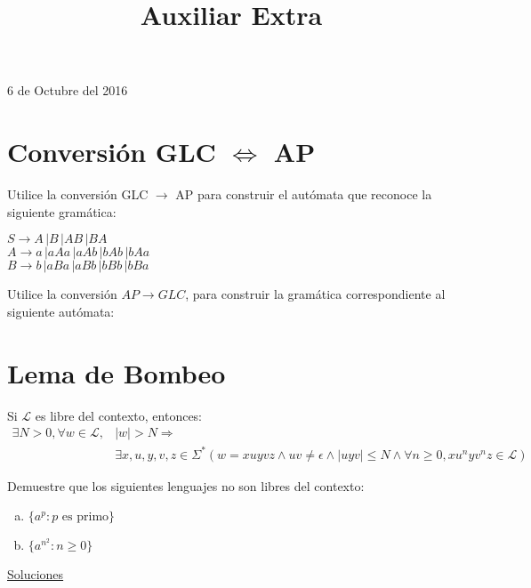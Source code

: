 \documentclass[dcc]{fcfmcourse}
\title{Auxiliar Extra}
\begin{document}
\maketitle
\begin{center}
6 de Octubre del 2016
\end{center}
\vspace{-1ex}

\section*{Conversión GLC $\Leftrightarrow$ AP}
\begin{problems}
\problem Utilice la conversión GLC $\rightarrow$ AP para construir el autómata que reconoce la siguiente gramática:
\begin{center}
$S \rightarrow A\, | B\, | AB\, | BA$\\
$A \rightarrow a\, | aAa\, | aAb\, | bAb\,| bAa$\\
$B \rightarrow b\, | aBa\, | aBb\, | bBb\,| bBa$
\end{center}

\problem Utilice la conversión $AP \rightarrow GLC$, para construir la gramática correspondiente al siguiente autómata:\\
\begin{center}
\end{center}
\end{problems}
\section*{Lema de Bombeo}
Si $\mathcal{L}$ es libre del contexto, entonces:
\begin{align*}
\exists N > 0, \forall w \in \mathcal{L}, &|w| > N \Rightarrow\\
&\exists x,u,y,v,z \in \Sigma^* (w=xuyvz \land uv \not = \epsilon \land |uyv|\le N \land \forall n \ge 0, xu^nyv^nz \in \mathcal{L})
\end{align*}

\begin{problems}
\problem Demuestre que los siguientes lenguajes no son libres del contexto:
\begin{enumerate}[a)]
    \item $\{a^p \colon p \text{ es primo}\}$
    \item $\{a^{n^2} \colon n \ge 0\}$
\end{enumerate}
\end{problems}
\newpage
\begin{center}
{\huge \underline{Soluciones}}
\end{center}
\end{document}
